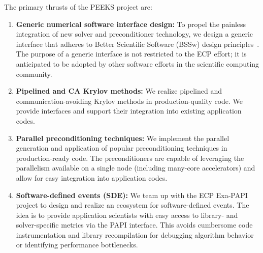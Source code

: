 The primary thrusts of the PEEKS project are:
\begin{enumerate}
    \item \textbf{Generic numerical software interface design:}
	To propel the painless integration of new solver and preconditioner 
	technology, we design a generic interface that adheres to 
	Better Scientific Software (BSSw) design 
	principles~\cite{betterscientificsoftware}.
    The purpose of a generic interface is not restricted to the ECP effort; it is 
    anticipated to be adopted by other software efforts in the scientific 
    computing community.
	\item \textbf{Pipelined and CA Krylov methods:} 
    We realize pipelined and 
	communication-avoiding Krylov methods in production-quality code. We 
	provide interfaces and support their integration into existing application 
	codes.
	\item \textbf{Parallel preconditioning techniques:}  We implement the 
	parallel generation and application of popular preconditioning techniques 
	in production-ready code. The preconditioners are capable of leveraging the 
	parallelism available on a single node (including many-core accelerators) 
	and allow for easy integration into application codes.
    \item \textbf{Software-defined events (SDE):}  We team up with the ECP 
    Exa-PAPI project to design and realize an ecosystem for software-defined 
    events. The idea is to provide application scientists with easy access 
    to library- and solver-specific metrics via the PAPI interface. This 
    avoids cumbersome code instrumentation and library recompilation for 
    debugging algorithm behavior or identifying performance bottlenecks. 
\end{enumerate}

